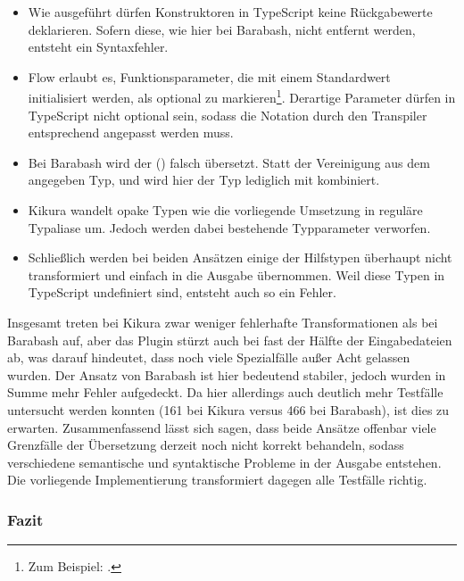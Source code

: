 \begin{itemize}
  \item Wie ausgeführt dürfen Konstruktoren in TypeScript keine Rückgabewerte deklarieren. Sofern diese, wie hier bei Barabash, nicht entfernt werden, entsteht ein Syntaxfehler.
  \item Flow erlaubt es, Funktionsparameter, die mit einem Standardwert~\autocite{MDN:DEFAULT_PARAMS} initialisiert werden, als optional zu markieren\footnote{Zum Beispiel: .}. Derartige Parameter dürfen in TypeScript nicht optional sein, sodass die Notation durch den Transpiler entsprechend angepasst werden muss.
  \item Bei Barabash wird der  () falsch übersetzt. Statt der Vereinigung aus dem angegeben Typ,  und  wird hier der Typ lediglich mit  kombiniert.
  \item Kikura wandelt opake Typen wie die vorliegende Umsetzung in reguläre Typaliase um. Jedoch werden dabei bestehende Typparameter verworfen.
  \item Schließlich werden bei beiden Ansätzen einige der Hilfstypen überhaupt nicht transformiert und einfach in die Ausgabe übernommen. Weil diese Typen in TypeScript undefiniert sind, entsteht auch so ein Fehler.
\end{itemize}

Insgesamt treten bei Kikura zwar weniger fehlerhafte Transformationen als bei Barabash auf, aber das Plugin stürzt auch bei fast der Hälfte der Eingabedateien ab, was darauf hindeutet, dass noch viele Spezialfälle außer Acht gelassen wurden. Der Ansatz von Barabash ist hier bedeutend stabiler, jedoch wurden in Summe mehr Fehler aufgedeckt. Da hier allerdings auch deutlich mehr Testfälle untersucht werden konnten (161 bei Kikura versus 466 bei Barabash), ist dies zu erwarten. Zusammenfassend lässt sich sagen, dass beide Ansätze offenbar viele Grenzfälle der Übersetzung derzeit noch nicht korrekt behandeln, sodass verschiedene semantische und syntaktische Probleme in der Ausgabe entstehen. Die vorliegende Implementierung transformiert dagegen alle Testfälle richtig.

\subsubsection{Fazit}

